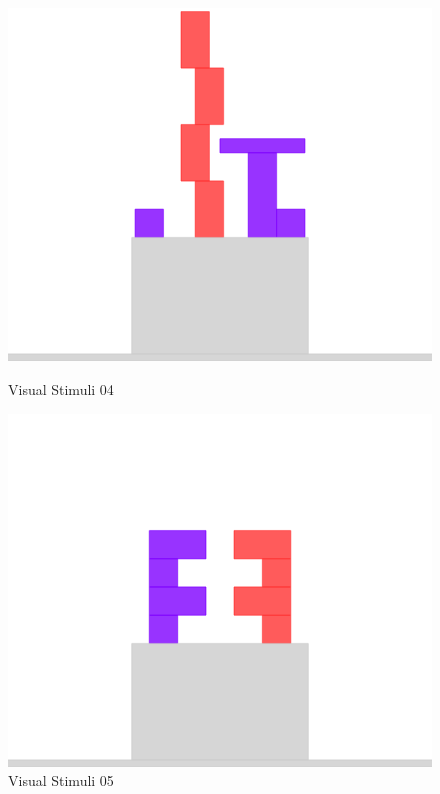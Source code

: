 \documentclass[10pt,letterpaper]{article}
\begin{document}
\newpage

\begin{figure}[h]
    \parbox{.47\linewidth}{
        \centering
        \includegraphics[scale=0.3]{images/ensemble4.png}
        \caption{Visual Stimuli 04}
        \label{table:llama70B-fixed-deceiver-correlation}
    }
    \hfill
    \parbox{.47\linewidth}{
        \centering
        \includegraphics[scale=0.3]{images/ensemble5.png}
        \caption{Visual Stimuli 05}
        \label{table:gpt35-fixed-deceiver-correlation}
    }
\end{figure}
\end{document}
